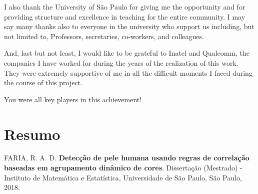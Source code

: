 \documentclass[12pt,twoside,a4paper]{book}
\theoremstyle{plain}
\theoremstyle{definition}
\begin{document}
I also thank the University of São Paulo for giving me the opportunity and for providing structure and excellence in teaching for the entire community. I may say many thanks also to everyone in the university who support us including, but not limited to, Professors, secretaries, co-workers, and colleagues.

And, last but not least, I would like to be grateful to Inatel and Qualcomm, the companies I have worked for during the years of the realization of this work. They were extremely supportive of me in all the difficult moments I faced during the course of this project.

You were all key players in this achievement!


\chapter*{Resumo}

\noindent FARIA, R. A. D. \textbf{Detecção de pele humana usando regras de correlação baseadas em agrupamento dinâmico de cores}.
Dissertação (Mestrado) - Instituto de Matemática e Estatística,
Universidade de São Paulo, São Paulo, 2018.
\\
\end{document}
